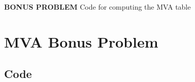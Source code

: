 \documentclass{article}
\begin{document}
	\textbf{BONUS PROBLEM}
	Code for computing the MVA table

	\section{MVA Bonus Problem}
		\subsection{Code}
			
\end{document}
